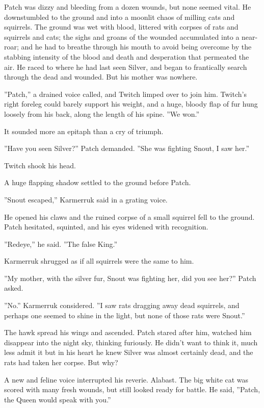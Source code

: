 \documentclass[12pt]{book}
\begin{document}
 Patch was dizzy and bleeding from a dozen wounds, but none seemed vital. He downstumbled to the ground and into a moonlit chaos of milling cats and squirrels. The ground was wet with blood, littered with corpses of rats and squirrels and cats; the sighs and groans of the wounded accumulated into a near-roar; and he had to breathe through his mouth to avoid being overcome by the stabbing intensity of the blood and death and desperation that permeated the air. He raced to where he had last seen Silver, and began to frantically search through the dead and wounded. But his mother was nowhere.\par
 ''Patch,'' a drained voice called, and Twitch limped over to join him. Twitch's right foreleg could barely support his weight, and a huge, bloody flap of fur hung loosely from his back, along the length of his spine. ''We won.''\par
 It sounded more an epitaph than a cry of triumph.\par
 ''Have you seen Silver?'' Patch demanded. ''She was fighting Snout, I saw her.''\par
 Twitch shook his head.\par
 A huge flapping shadow settled to the ground before Patch.\par
 ''Snout escaped,'' Karmerruk said in a grating voice.\par
 He opened his claws and the ruined corpse of a small squirrel fell to the ground. Patch hesitated, squinted, and his eyes widened with recognition.\par
 ''Redeye,'' he said. ''The false King.''\par
 Karmerruk shrugged as if all squirrels were the same to him.\par
 ''My mother, with the silver fur, Snout was fighting her, did you see her?'' Patch asked.\par
 ''No.'' Karmerruk considered. ''I saw rats dragging away dead squirrels, and perhaps one seemed to shine in the light, but none of those rats were Snout.''\par
 The hawk spread his wings and ascended. Patch stared after him, watched him disappear into the night sky, thinking furiously. He didn't want to think it, much less admit it %
 but in his heart he knew Silver was almost certainly dead, and the rats had taken her corpse. But why?\par
 A new and feline voice interrupted his reverie. Alabast. The big white cat was scored with many fresh wounds, but still looked ready for battle. He said, ''Patch, the Queen would speak with you.''\par
\end{document}
